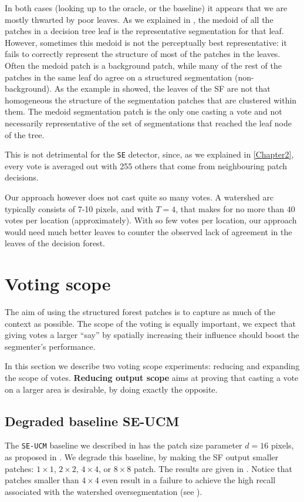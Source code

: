 In both cases (looking up to the oracle, or the baseline) it appears that we are mostly thwarted by poor leaves. As we explained in , the medoid of all the patches in a decision tree leaf is the representative segmentation for that leaf. However, sometimes this medoid is not the perceptually best representative: it fails to correctly represent the structure of most of the patches in the leaves. Often the medoid patch is a background patch, while many %
of the rest of the patches in the same leaf do agree on a structured segmentation (non-background). %
As the example in  showed, the leaves of the SF are not that homogeneous \wrt the structure of the segmentation patches that are clustered within them. 
The medoid segmentation patch is the only one casting a vote and not necessarily representative of the set of segmentations that reached the leaf node of the tree.

This is not detrimental for the {\tt SE} detector, since, as we explained %
in \cref{Chapter2}, every vote is averaged out with 255 others %
that come from neighbouring patch decisions. 

Our approach however does not cast quite so many votes. A watershed arc typically consists of 7-10 pixels, and with $T=4$, that makes %
for no more than 40 votes per location (approximately). 
With so few votes per location, our approach would need much better leaves to counter the observed lack of %
agreement in the leaves of the decision forest.


\section{Voting scope}
The aim of using the structured forest patches is to capture as much of the context as possible. The scope of the voting is equally important, we expect that giving votes a larger ``say'' by spatially increasing their influence should boost the segmenter's performance.

In this section we describe two voting scope experiments: reducing and expanding the scope of votes. \textbf{Reducing output scope} %
aims at proving that casting a vote on a larger area is desirable, by doing exactly the opposite.

\subsection{Degraded baseline SE-UCM}
The {\tt SE-UCM} baseline we described in  has the patch size parameter $d=16$ pixels, as proposed in \cite{DollarICCV13edges}. We degrade this baseline, by making the SF output smaller patches: $1\times1$, $2\times2$, $4\times4$, or $8\times8$ patch. The results are given in . Notice that patches smaller than $4\times 4$ even result in a failure to achieve the high recall associated with the watershed oversegmentation (see ).

